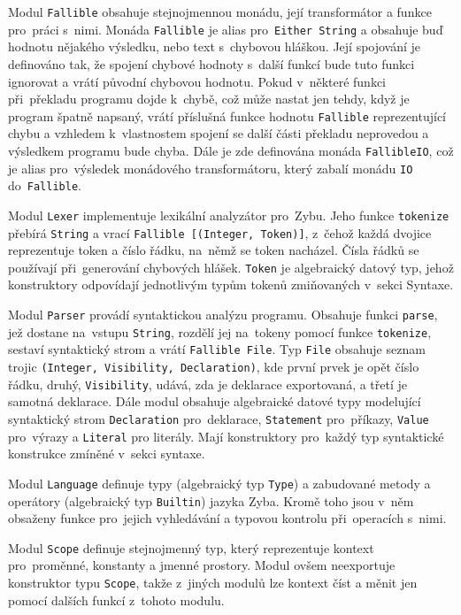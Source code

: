 \documentclass[a4paper,12pt]{article}
\begin{document}
Modul \texttt{Fallible} obsahuje stejnojmennou monádu, její transformátor a funkce pro~práci s~nimi. Monáda \texttt{Fallible} je alias pro~\texttt{Either String} a obsahuje buď hodnotu nějakého výsledku, nebo text s~chybovou hláškou. Její spojování je definováno tak, že spojení chybové hodnoty s~další funkcí bude tuto funkci ignorovat a vrátí původní chybovou hodnotu. Pokud v~některé funkci při~překladu programu dojde k~chybě, což může nastat jen tehdy, když je program špatně napsaný, vrátí příslušná funkce hodnotu \texttt{Fallible} reprezentující chybu a vzhledem k~vlastnostem spojení se další části překladu neprovedou a výsledkem programu bude chyba. Dále je zde definována monáda \texttt{FallibleIO}, což je alias pro~výsledek monádového transformátoru, který zabalí monádu \texttt{IO} do~\texttt{Fallible}.

Modul \texttt{Lexer} implementuje lexikální analyzátor pro~Zybu. Jeho funkce \texttt{tokenize} přebírá \texttt{String} a vrací \texttt{Fallible [(Integer, Token)]}, z~čehož každá dvojice reprezentuje token a číslo řádku, na~němž se token nacházel. Čísla řádků se používají při~generování chybových hlášek. \texttt{Token} je algebraický datový typ, jehož konstruktory odpovídají jednotlivým typům tokenů zmiňovaných v~sekci Syntaxe.

Modul \texttt{Parser} provádí syntaktickou analýzu programu. Obsahuje funkci \texttt{parse}, jež dostane na~vstupu \texttt{String}, rozdělí jej na~tokeny pomocí funkce \texttt{tokenize}, sestaví syntaktický strom a vrátí \texttt{Fallible File}. Typ \texttt{File} obsahuje seznam trojic \texttt{(Integer, Visibility, Declaration)}, kde první prvek je opět číslo řádku, druhý, \texttt{Visibility}, udává, zda je deklarace exportovaná, a třetí je samotná deklarace. Dále modul obsahuje algebraické datové typy modelující syntaktický strom \texttt{Declaration} pro~deklarace, \texttt{Statement} pro~příkazy, \texttt{Value} pro~výrazy a \texttt{Literal} pro literály. Mají konstruktory pro~každý typ syntaktické konstrukce zmíněné v~sekci syntaxe.

Modul \texttt{Language} definuje typy (algebraický typ \texttt{Type}) a zabudované metody a operátory (algebraický typ \texttt{Builtin}) jazyka Zyba. Kromě toho jsou v~něm obsaženy funkce pro~jejich vyhledávání a typovou kontrolu při~operacích s~nimi.

Modul \texttt{Scope} definuje stejnojmenný typ, který reprezentuje kontext pro~proměnné, konstanty a jmenné prostory. Modul ovšem neexportuje konstruktor typu \texttt{Scope}, takže z~jiných modulů lze kontext číst a měnit jen pomocí dalších funkcí z~tohoto modulu.
\end{document}
